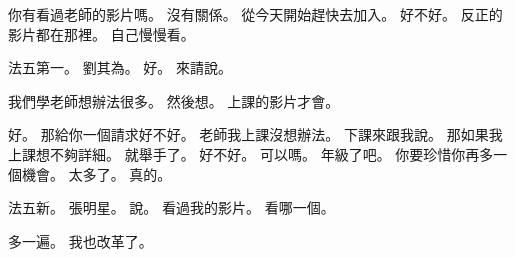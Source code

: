 \hypertarget{c01:cue:2001}{}你有看過老師的影片嗎。
\hypertarget{c01:cue:2002}{}沒有關係。
\hypertarget{c01:cue:2003}{}從今天開始趕快去加入。
\hypertarget{c01:cue:2004}{}好不好。
\hypertarget{c01:cue:2005}{}反正的影片都在那裡。
\hypertarget{c01:cue:2006}{}自己慢慢看。

\hypertarget{c01:cue:2007}{}法五第一。
\hypertarget{c01:cue:2008}{}劉其為。
\hypertarget{c01:cue:2009}{}好。
\hypertarget{c01:cue:2010}{}來請說。

\hypertarget{c01:cue:2011}{}我們學老師想辦法很多。
\hypertarget{c01:cue:2012}{}然後想。
\hypertarget{c01:cue:2013}{}上課的影片才會。

\hypertarget{c01:cue:2014}{}好。
\hypertarget{c01:cue:2015}{}那給你一個請求好不好。
\hypertarget{c01:cue:2016}{}老師我上課沒想辦法。
\hypertarget{c01:cue:2017}{}下課來跟我說。
\hypertarget{c01:cue:2018}{}那如果我上課想不夠詳細。
\hypertarget{c01:cue:2019}{}就舉手了。
\hypertarget{c01:cue:2020}{}好不好。
\hypertarget{c01:cue:2021}{}可以嗎。
\hypertarget{c01:cue:2022}{}年級了吧。
\hypertarget{c01:cue:2023}{}你要珍惜你再多一個機會。
\hypertarget{c01:cue:2024}{}太多了。
\hypertarget{c01:cue:2025}{}真的。

\hypertarget{c01:cue:2026}{}法五新。
\hypertarget{c01:cue:2027}{}張明星。
\hypertarget{c01:cue:2028}{}說。
\hypertarget{c01:cue:2029}{}看過我的影片。
\hypertarget{c01:cue:2030}{}看哪一個。

\hypertarget{c01:cue:2031}{}多一遍。
\hypertarget{c01:cue:2032}{}我也改革了。

